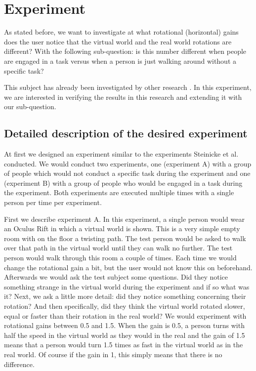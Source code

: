 \section{Experiment}
As stated before, we want to investigate at what rotational (horizontal) gains does the user notice that the virtual world and the real world rotations are different? 
With the following sub-question: is this number different when people are engaged in a task versus when a person is just walking around without a specific task?

This subject has already been investigated by other research \cite{steinicke1}\cite{steinicke2}. 
In this experiment, we are interested in verifying the results in this research and extending it with our sub-question.

\subsection{Detailed description of the desired experiment}\label{sec:description}
At first we designed an experiment similar to the experiments Steinicke et al. conducted. 
We would conduct two experiments, one (experiment A) with a group of people which would not conduct a specific task during the experiment and one (experiment B) with a group of people who would be engaged in a task during the experiment. 
Both experiments are executed multiple times with a single person per time per experiment. 

First we describe experiment A.
In this experiment, a single person would wear an Oculus Rift in which a virtual world is shown.
This is a very simple empty room with on the floor a twisting path. 
The test person would be asked to walk over that path in the virtual world until they can walk no further. 
The test person would walk through this room a couple of times. 
Each time we would change the rotational gain a bit, but the user would not know this on beforehand. 
Afterwards we would ask the test subject some questions. 
Did they notice something strange in the virtual world during the experiment and if so what was it? 
Next, we ask a little more detail: did they notice something concerning their rotation? 
And then specifically, did they think the virtual world rotated slower, equal or faster than their rotation in the real world?
We would experiment with rotational gains between 0.5 and 1.5.
When the gain is 0.5, a person turns with half the speed in the virtual world as they would in the real and the gain of 1.5 means that a person would turn 1.5 times as fast in the virtual world as in the real world. 
Of course if the gain in 1, this simply means that there is no difference.

